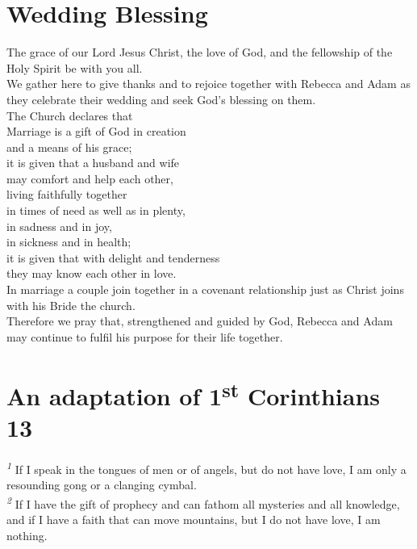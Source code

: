 \documentclass[a5paper,12pt,titlepage]{article}
\begin{document}
\clearpage

\section{Wedding Blessing} 

The grace of our Lord Jesus Christ, the love of God, and the fellowship of the Holy Spirit be with you all. \\

We gather here to give thanks and to rejoice together with Rebecca and Adam as they celebrate their wedding and seek God's blessing on them. \\

The Church declares that\\

Marriage is a gift of God in creation\\
and a means of his grace;\\
it is given that a husband and wife\\
may comfort and help each other,\\
living faithfully together\\
in times of need as well as in plenty,\\
in sadness and in joy,\\
in sickness and in health;\\
it is given that with delight and tenderness\\
they may know each other in love.\\

\vspace{1em}
In marriage a couple join together in a covenant relationship just as Christ joins with his Bride the church.\\
Therefore we pray that, strengthened and guided by God, Rebecca and Adam may continue to fulfil his purpose for their life together.\\


\clearpage

\section{An adaptation of 1\textsuperscript{st} Corinthians 13}

\textsuperscript{\em 1} If I speak in the tongues of men or of angels, but do not have love, I am only a resounding gong or a clanging cymbal.\\[0.25em]

\textsuperscript{\em 2} If I have the gift of prophecy and can fathom all mysteries and all knowledge, and if I have a faith that can move mountains, but I do not have love, I am nothing. \\[0.25em]
\end{document}
